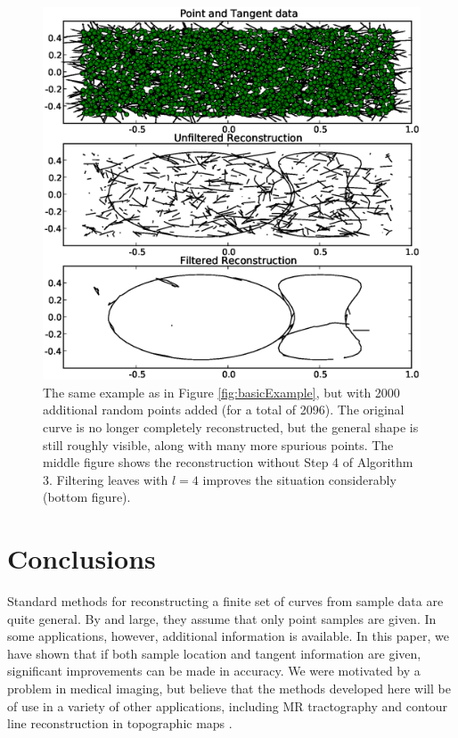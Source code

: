 \documentclass{article}
\numberwithin{cntr}{section}
\numberwithin{equation}{section}
\begin{document}
\begin{figure}
\setlength{\unitlength}{0.240900pt}
\ifx\plotpoint\undefined\newsavebox{\plotpoint}\fi
\sbox{\plotpoint}{\rule[-0.200pt]{0.400pt}{0.400pt}}%
\includegraphics[scale=0.5]{more_noisy_example.eps}
\caption{The same example as in Figure \ref{fig:basicExample}, but with
2000 additional random points added (for a total of 2096).
The original curve is no longer completely reconstructed, but the
general shape is still roughly visible, along with many more spurious
points. The middle figure shows the reconstruction
without Step 4 of Algorithm 3. Filtering leaves with $l=4$ improves
the situation considerably (bottom figure).
\label{fig:moreNoisyExample}}
\end{figure}

\section{Conclusions}

Standard methods for reconstructing a finite set of 
curves from sample data are quite general.
By and large, they assume that only point samples are given.
In some applications, however, additional information is available.
In this paper, we have shown that if both sample location and
tangent information are given, significant improvements can be made
in accuracy. We were motivated by a problem in medical imaging, 
but believe that
the methods developed here will be of use in a variety of other applications,
including MR tractography and contour line reconstruction in topographic
maps \cite{GORE,TOPO}.
\end{document}
